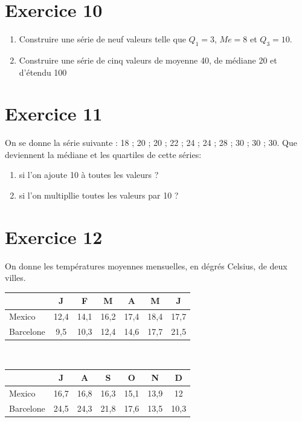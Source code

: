 \documentclass[french]{article}
\begin{document}
   \section*{Exercice 10}
   \begin{enumerate}
   \item Construire une série de neuf valeurs telle que $Q_1=3$, $Me=8$ et $Q_3=10$.
   \item Construire une série de cinq valeurs de moyenne 40, de médiane 20 et d'étendu 100 
   \end{enumerate}
   
   \section*{Exercice 11}
   On se donne la série suivante : 18 ; 20 ; 20 ; 22 ; 24 ; 24 ; 28 ; 30 ; 30 ; 30.
   Que deviennent la médiane et les quartiles de cette séries: 
   \begin{enumerate}
   \item si l'on ajoute 10 à toutes les valeurs ?
   \item si l'on multipllie toutes les valeurs par 10 ?
   \end{enumerate}
   
   \section*{Exercice 12}
   On donne les températures moyennes mensuelles, en dégrés Celsius, de deux villes.
  
   \begin{tabular}{| l | c | c | c | c | c | c |}
     \hline
      	& J & F & M & A & M & J \\ \hline
     Mexico & 12,4 & 14,1 & 16,2 & 17,4 & 18,4 & 17,7 \\ \hline
     Barcelone & 9,5 & 10,3 & 12,4 & 14,6 & 17,7 & 21,5  \\ 
     \hline 
   \end{tabular}\\
   
   \begin{tabular}{| l | c | c | c | c | c | c |}
     \hline
      	& J & A & S & O & N & D \\ \hline
     Mexico & 16,7 & 16,8 & 16,3 & 15,1 & 13,9 & 12 \\ \hline
     Barcelone & 24,5 & 24,3 & 21,8 & 17,6 & 13,5 & 10,3  \\ 
     \hline
   \end{tabular}\\
   
\end{document}

